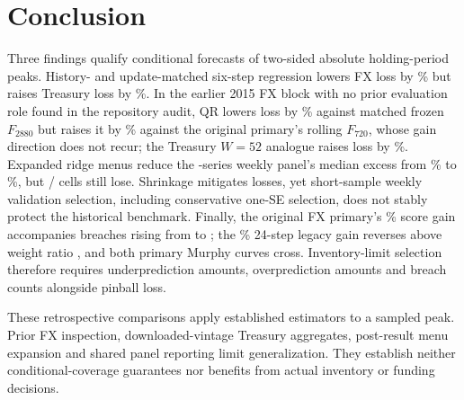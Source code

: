 \section{Conclusion}
Three findings qualify conditional forecasts of two-sided absolute holding-period peaks. History- and update-matched six-step regression lowers FX loss by \FXMatchedGain{}\% but raises Treasury loss by \TreasuryOriginalExcess{}\%. In the earlier 2015 FX block with no prior evaluation role found in the repository audit, QR lowers loss by \RWritingMatchedGain{}\% against matched frozen $F_{2880}$ but raises it by \RWritingOriginalExcess{}\% against the original primary's rolling $F_{720}$, whose gain direction does not recur; the Treasury $W=52$ analogue raises loss by \RWritingTreasuryExcess{}\%. Expanded ridge menus reduce the \PanelSeriesCount{}-series weekly panel's median excess from \PanelOriginalMedian{}\% to \PanelExpandedMedian{}\%, but \PanelExpandedLosses{}/\PanelCellCount{} cells still lose. Shrinkage mitigates losses, yet short-sample weekly validation selection, including conservative one-SE selection, does not stably protect the historical benchmark. Finally, the original FX primary's \FXPrimaryGain{}\% score gain accompanies breaches rising from \FXReferenceBreaches{} to \FXPrimaryBreaches{}; the \FXLegacyGain{}\% 24-step legacy gain reverses above weight ratio \FXLegacyCrossing{}, and both primary Murphy curves cross. Inventory-limit selection therefore requires underprediction amounts, overprediction amounts and breach counts alongside pinball loss.

These retrospective comparisons apply established estimators to a sampled peak. Prior FX inspection, downloaded-vintage Treasury aggregates, post-result menu expansion and shared panel reporting limit generalization. They establish neither conditional-coverage guarantees nor benefits from actual inventory or funding decisions.
